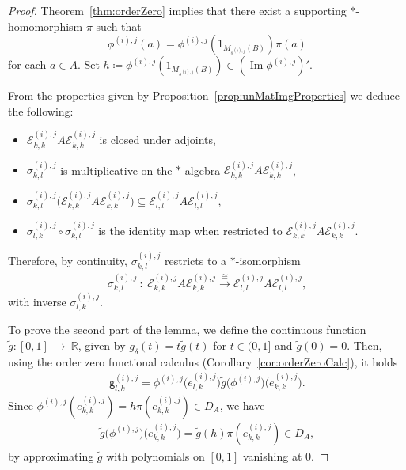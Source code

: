 \documentclass[a4paper]{amsart}
\newcommand{\myhyp}{\textnormal{-}\hskip0pt\relax}
\numberwithin{equation}{section}
\newcommand{\Ecal}{\mathcal{E}}
\newcommand{\rAr}{\longrightarrow}
\DeclareMathOperator{\img}{Im}
\newcommand{\unMatImg}[3]{{\Ecal_{#3}^{(#1), #2}}}
\newcommand{\gUnMatImg}[3]{{ \mathsf{g}_{#3}^{(#1), #2}}}
\theoremstyle{plain}
\theoremstyle{indented}
\numberwithin{equation}{section}
\theoremstyle{definition}
\theoremstyle{remark}
\theoremstyle{plain}
\theoremstyle{definition}
\begin{document}
\begin{proof}
    Theorem~\ref{thm:orderZero} implies that 
    there exist a supporting ${\ast}$\myhyp{}homomorphism $\pi$ such that 
    \[\phi^{(i),j}(a)= \phi^{(i),j}(1_{M_{s^{(i),j}}(B)}) \pi(a)\] 
    for each $a \in A$. 
    Set ${h \coloneq \phi^{(i),j}(1_{M_{s^{(i),j}}(B)}) \in (\img{\phi^{(i),j}})'}$.
    
    From the properties given by Proposition~\ref{prop:unMatImgProperties} we deduce the following:
    \begin{itemize}
        \item ${\unMatImg{i}{j}{k,k} A \unMatImg{i}{j}{k,k}}$ is closed under adjoints,
        \item $\sigma_{k,l}^{(i),j}$ is multiplicative on the $\ast$\myhyp{}algebra ${\unMatImg{i}{j}{k,k} A \unMatImg{i}{j}{k,k}}$,
        
     \item ${\sigma_{k,l}^{(i),j}\big( \unMatImg{i}{j}{k,k} A \unMatImg{i}{j}{k,k} \big) \subseteq \unMatImg{i}{j}{l,l} A \unMatImg{i}{j}{l,l}}$,
    
    \item ${\sigma_{l,k}^{(i),j} \circ \sigma_{k,l}^{(i),j}}$ is the identity map
    when restricted to ${\unMatImg{i}{j}{k,k} A \unMatImg{i}{j}{k,k}}$.
    \end{itemize}
    Therefore, by continuity, $\sigma_{k,l}^{(i),j}$ restricts to a ${\ast}$-isomorphism
    \[ \sigma_{k,l}^{(i),j}~\colon~
    \overline{\unMatImg{i}{j}{k,k} A \unMatImg{i}{j}{k,k}}  \overset{\cong}{\longrightarrow}\overline{\unMatImg{i}{j}{l,l} A \unMatImg{i}{j}{l,l}}, \]
    with inverse $\sigma_{l,k}^{(i),j}$.

    To prove the second part of the lemma, we define the continuous function ${\widetilde{g} : [0,1]~\rAr~\mathbb{R}}$, given by ${g_\delta(t) = t \widetilde{g}(t)}$ for ${t \in (0,1]}$ and ${\widetilde{g}(0)=0}$. 
    Then, using the order zero functional calculus (Corollary~\ref{cor:orderZeroCalc}), it holds
    \begin{align*}
        \gUnMatImg{i}{j}{l,k} = \phi^{(i),j}\big(e_{l,k}^{(i),j}\big) \widetilde{g}\big({\phi^{(i),j}}\big) \big(e_{k,k}^{(i),j}\big).
    \end{align*}
    Since
    ${\phi^{(i),j}(e_{k,k}^{(i),j}) = h \pi(e_{k,k}^{(i),j}) \in D_A}$, 
    we have
    \begin{align*}
       \widetilde{g}\big({\phi^{(i),j}}\big) \big(e_{k,k}^{(i),j}\big)= \widetilde{g}(h)\pi(e_{k,k}^{(i),j}) \in D_A,
    \end{align*}
    by approximating $\widetilde{g}$ with polynomials on $[0,1]$ vanishing at $0$. 
    

\end{proof}
\end{document}
